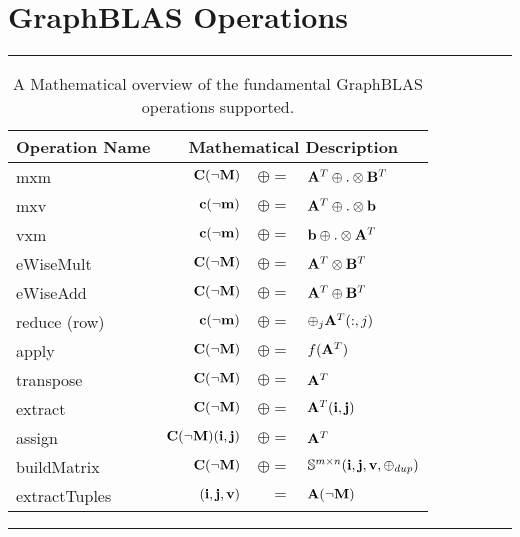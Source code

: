 \section{GraphBLAS Operations}
\label{Sec:Operations}

\begin{table*}[h]
\hrule
\begin{center}
\caption{A Mathematical overview of the fundamental GraphBLAS operations supported.}
\label{Tab:GraphBLASOps}
\begin{tabular}{l|rrl}
{\sf Operation Name} & \multicolumn{3}{c}{Mathematical Description}  \\
\hline
{\sf mxm}          & ${\bf C}(\neg{\bf M})$ & $\oplus=$ & ${\bf A}^T \oplus.\otimes {\bf B}^T$  \\
{\sf mxv}          & ${\bf c}(\neg{\bf m})$ & $\oplus=$ & ${\bf A}^T \oplus.\otimes {\bf b}$  \\
{\sf vxm}          & ${\bf c}(\neg{\bf m})$ & $\oplus=$ & ${\bf b} \oplus.\otimes {\bf A}^T$  \\
{\sf eWiseMult}    & ${\bf C}(\neg{\bf M})$ & $\oplus=$ & ${\bf A}^T \otimes {\bf B}^T$  \\
{\sf eWiseAdd}     & ${\bf C}(\neg{\bf M})$ & $\oplus=$ & ${\bf A}^T \oplus  {\bf B}^T$  \\
{\sf reduce} (row) & ${\bf c}(\neg{\bf m})$ & $\oplus=$ & $\oplus_j{\bf A}^T(:,j)$  \\
{\sf apply}        & ${\bf C}(\neg{\bf M})$ & $\oplus=$ & $f({\bf A}^T)$ \\
{\sf transpose}    & ${\bf C}(\neg{\bf M})$ & $\oplus=$ & ${\bf A}^T$ \\
{\sf extract}      & ${\bf C}(\neg{\bf M})$ & $\oplus=$ & ${\bf A}^T({\bf i},{\bf j})$ \\
{\sf assign}       & ${\bf C}(\neg{\bf M})({\bf i},{\bf j})$ & $\oplus=$ & ${\bf A}^T$ \\
{\sf buildMatrix}  & ${\bf C}(\neg{\bf M})$ & $\oplus=$ & $\mathbb{S}^{m\times n}({\bf i},{\bf j},{\bf v},\oplus_{dup})$ \\
{\sf extractTuples}& $({\bf i},{\bf j},{\bf v})$ & $=$ & ${\bf A}(\neg{\bf M})$ \\
\end{tabular}
\end{center}
\hrule
\end{table*}


